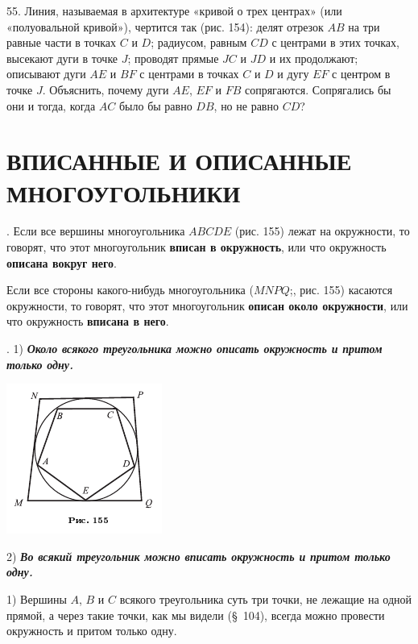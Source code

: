 \documentclass[oneside]{book}
\begin{document}
55.
Линия, называемая в архитектуре «кривой о трех центрах» (или «полуовальной кривой»), чертится так (рис. 154):
делят отрезок $AB$ на три равные части в точках $C$ и $D$;
радиусом, равным $CD$ с центрами в этих точках, высекают дуги в точке $J$;
проводят прямые $JC$ и $JD$ и их продолжают;
описывают дуги $AE$ и $BF$ с центрами в точках $C$ и $D$ и дугу $EF$ с центром в точке $J$.
Объяснить, почему дуги $AE$, $EF$ и $FB$ сопрягаются.
Сопрягались бы они и тогда, когда $AC$ было бы равно $DB$, но не равно $CD$?

\section{ВПИСАННЫЕ И ОПИСАННЫЕ МНОГОУГОЛЬНИКИ}

.
Если все вершины многоугольника $ABCDE$ (рис. 155) лежат на окружности, то говорят, что этот многоугольник \textbf{вписан в окружность}, или что окружность \textbf{описана вокруг него}.

Если все стороны какого-нибудь многоугольника ($MNPQ$;, рис. 155) касаются окружности, то говорят, что этот многоугольник \textbf{описан около окружности}, или что окружность \textbf{вписана в него}.

.
1) \textbf{\emph{Около всякого треугольника можно описать окружность и притом только одну.}}

\includegraphics{pics/ris-155}

2) \textbf{\emph{Во всякий треугольник можно вписать окружность и притом только одну.}}

1) Вершины $A$, $B$ и $C$ всякого треугольника суть три точки, не лежащие на одной прямой, а через такие точки, как мы видели (§~104), всегда можно провести окружность и притом только одну.
\end{document}

